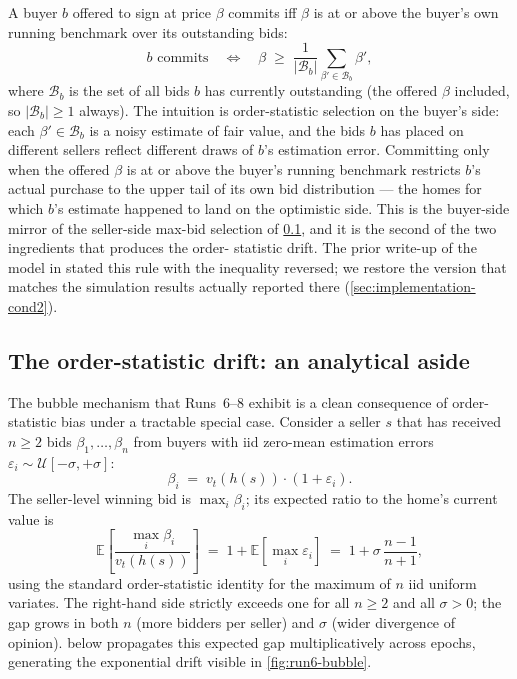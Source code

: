 A buyer $b$ offered to sign at price $\beta$ commits iff $\beta$ is
at or above the buyer's own running benchmark over its outstanding
bids:
\begin{equation}
\label{eq:cond2}
b \text{ commits} \quad\Longleftrightarrow\quad \beta \;\ge\; \frac{1}{|\mathcal{B}_{b}|}\sum_{\beta' \in \mathcal{B}_{b}} \beta',
\end{equation}
where $\mathcal{B}_{b}$ is the set of all bids $b$ has currently
outstanding (the offered $\beta$ included, so $|\mathcal{B}_{b}| \ge 1$
always). The intuition is order-statistic selection on the buyer's
side: each $\beta' \in \mathcal{B}_{b}$ is a noisy estimate of fair
value, and the bids $b$ has placed on different sellers reflect
different draws of $b$'s estimation error. Committing only when the
offered $\beta$ is at or above the buyer's running benchmark
restricts $b$'s actual purchase to the upper tail of its own bid
distribution --- the homes for which $b$'s estimate happened to
land on the optimistic side. This is the buyer-side mirror of the
seller-side max-bid selection of \cref{sec:framework-asymmetry}, and
it is the second of the two ingredients that produces the order-
statistic drift. The prior write-up of the model in
\citet{arbuzov2018de} stated this rule with the inequality reversed;
we restore the version that matches the simulation results actually
reported there (\cref{sec:implementation-cond2}).

\subsection{The order-statistic drift: an analytical aside}
\label{sec:framework-asymmetry}

The bubble mechanism that Runs~6--8 exhibit is a clean consequence
of order-statistic bias under a tractable special case. Consider a
seller $s$ that has received $n \ge 2$ bids
$\beta_{1}, \dots, \beta_{n}$ from buyers with iid zero-mean
estimation errors $\varepsilon_{i} \sim \mathcal{U}[-\sigma, +\sigma]$:
\begin{equation}
\label{eq:bid-decomp}
\beta_{i} \;=\; v_{t}(h(s)) \cdot (1 + \varepsilon_{i}).
\end{equation}
The seller-level winning bid is $\max_{i} \beta_{i}$; its expected
ratio to the home's current value is
\begin{equation}
\label{eq:ostat-bias}
\mathbb{E}\!\left[\frac{\max_{i}\beta_{i}}{v_{t}(h(s))}\right]
\;=\;
1 + \mathbb{E}\!\left[\max_{i}\varepsilon_{i}\right]
\;=\;
1 + \sigma\,\frac{n - 1}{n + 1},
\end{equation}
using the standard order-statistic identity for the maximum of $n$
iid uniform variates. The right-hand side strictly exceeds one for
all $n \ge 2$ and all $\sigma > 0$; the gap grows in both $n$
(more bidders per seller) and $\sigma$ (wider divergence of
opinion).  below propagates this expected gap
multiplicatively across epochs, generating the exponential drift
visible in \cref{fig:run6-bubble}.

